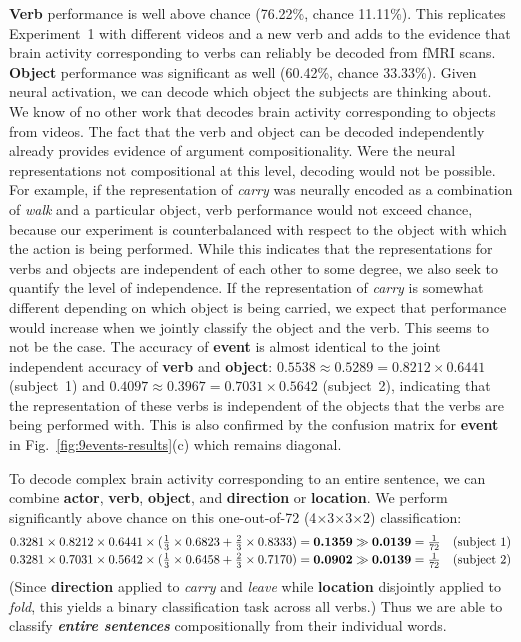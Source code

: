 \textbf{Verb} performance is well above chance (76.22\%, chance 11.11\%).
%
This replicates Experiment~1 with different videos and a new verb and adds to
the evidence that brain activity corresponding to verbs can reliably be decoded
from fMRI scans.
%
\textbf{Object} performance was significant as well (60.42\%, chance 33.33\%).
%
Given neural activation, we can decode which object the subjects are thinking
about.
%
We know of no other work that decodes brain activity corresponding to objects
from videos.
%
The fact that the verb and object can be decoded independently already provides
evidence of argument compositionality.
%
Were the neural representations not compositional at this level, decoding would
not be possible.
%
For example, if the representation of \emph{carry} was neurally encoded as a
combination of \emph{walk} and a particular object, verb performance would not
exceed chance, because our experiment is counterbalanced with respect to the
object with which the action is being performed.
%
While this indicates that the representations for verbs and objects are
independent of each other to some degree, we also seek to quantify the level of
independence.
%
If the representation of \emph{carry} is somewhat different depending on which
object is being carried, we expect that performance would increase when we
jointly classify the object and the verb.
%
This seems to not be the case.
%
The accuracy of \textbf{event} is almost identical to the joint independent
accuracy of \textbf{verb} and \textbf{object}:
$\text{0.5538}\approx\text{0.5289}=\text{0.8212}\times\text{0.6441}$
(subject~1) and
$\text{0.4097}\approx\text{0.3967}=\text{0.7031}\times\text{0.5642}$
(subject~2), indicating that the representation of these verbs is independent
of the objects that the verbs are being performed with.
%
This is also confirmed by the confusion matrix for \textbf{event} in
Fig.~\ref{fig:9events-results}(c) which remains diagonal.

To decode complex brain activity corresponding to an entire sentence, we can
combine \textbf{actor}, \textbf{verb}, \textbf{object}, and \textbf{direction}
or \textbf{location}.
%
We perform significantly above chance on this one-out-of-72
(4$\times$3$\times$3$\times$2) classification:
%
\begin{equation*}
  \begin{array}{@{}lr@{}}
\text{0.3281}\times\text{0.8212}\times\text{0.6441}\times(\frac{\text{1}}{\text{3}}\times\text{0.6823}+\frac{\text{2}}{\text{3}}\times\text{0.8333})=\textbf{0.1359}\gg\textbf{0.0139}=\frac{\text{1}}{\text{72}}
&\text{(subject~1)}\\[0.5ex]
\text{0.3281}\times\text{0.7031}\times\text{0.5642}\times(\frac{\text{1}}{\text{3}}\times\text{0.6458}+\frac{\text{2}}{\text{3}}\times\text{0.7170})=\textbf{0.0902}\gg\textbf{0.0139}=\frac{\text{1}}{\text{72}}&\text{(subject~2)}
  \end{array}
\end{equation*}
%
(Since \textbf{direction} applied to \emph{carry} and \emph{leave} while
\textbf{location} disjointly applied to \emph{fold}, this yields a binary
classification task across all verbs.)
%
Thus we are able to classify \textbf{\emph{entire sentences}} compositionally
from their individual words.

